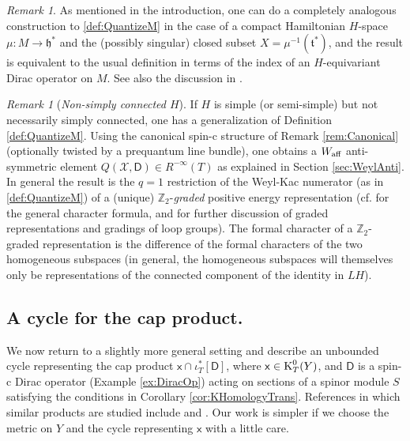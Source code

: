 \documentclass[11pt,reqno]{amsart}
\theoremstyle{definition}
\theoremstyle{remark}
\newtheorem{remark}[theorem]{Remark}
\newcommand{\st}[1]{\mathsf{#1}}
\def\t{\ensuremath{\mathfrak{t}}}
\def\h{\ensuremath{\mathfrak{h}}}
\def\K{\ensuremath{\mathcal{K}}}
\def\X{\ensuremath{\mathcal{X}}}
\def\bZ{\ensuremath{\mathbb{Z}}}
\def\aff{\ensuremath{\textnormal{aff}}}
\def\K{\ensuremath{\textnormal{K}}}
\begin{document}
\begin{remark}
As mentioned in the introduction, one can do a completely analogous construction to \ref{def:QuantizeM} in the case of a compact Hamiltonian $H$-space $\mu \colon M \rightarrow \h^\ast$ and the (possibly singular) closed subset $X=\mu^{-1}(\t^\ast)$, and the result is equivalent to the usual definition in terms of the index of an $H$-equivariant Dirac operator on $M$.  See also the discussion in \cite[Section 6]{LMSspinor}. 
\end{remark}

\begin{remark}[\emph{Non-simply connected $H$}]
If $H$ is simple (or semi-simple) but not necessarily simply connected, one has a generalization of Definition \ref{def:QuantizeM}.  Using the canonical spin-c structure of Remark \ref{rem:Canonical} (optionally twisted by a prequantum line bundle), one obtains a $W_{\aff}$ anti-symmetric element $Q(\X,\st{D}) \in R^{-\infty}(T)$ as explained in Section \ref{sec:WeylAnti}.  In general the result is the $q=1$ restriction of the Weyl-Kac numerator (as in \ref{def:QuantizeM}) of a (unique) $\bZ_2$-\emph{graded} positive energy representation (cf. \cite[Chapter 14]{PressleySegal} for the general character formula, and \cite{FHTII,FHTIII} for further discussion of graded representations and gradings of loop groups).  The formal character of a $\bZ_2$-graded representation is the difference of the formal characters of the two homogeneous subspaces (in general, the homogeneous subspaces will themselves only be representations of the connected component of the identity in $LH$).
\end{remark}

\subsection{A cycle for the cap product.}
We now return to a slightly more general setting and describe an unbounded cycle representing the cap product $\st{x}\cap \iota_T^\ast[\st{D}]$, where $\st{x} \in \K^0_T(Y)$, and $\st{D}$ is a spin-c Dirac operator (Example \ref{ex:DiracOp}) acting on sections of a spinor module $S$ satisfying the conditions in Corollary \ref{cor:KHomologyTrans}.  References in which similar products are studied include \cite{KucerovskyCallias, BunkeRelativeIndex} and \cite[Exercise 11.8.14]{HigsonRoe}.  Our work is simpler if we choose the metric on $Y$ and the cycle representing $\st{x}$ with a little care.
\end{document}
